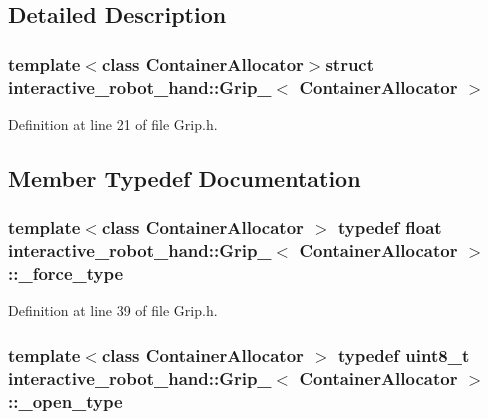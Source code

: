 \subsection{Detailed Description}
\subsubsection*{template$<$class Container\-Allocator$>$struct interactive\-\_\-robot\-\_\-hand\-::\-Grip\-\_\-$<$ Container\-Allocator $>$}



Definition at line 21 of file Grip.\-h.



\subsection{Member Typedef Documentation}
\subsubsection[{\-\_\-force\-\_\-type}]{\setlength{\rightskip}{0pt plus 5cm}template$<$class Container\-Allocator $>$ typedef float {\bf interactive\-\_\-robot\-\_\-hand\-::\-Grip\-\_\-}$<$ Container\-Allocator $>$\-::{\bf \-\_\-force\-\_\-type}}\label{structinteractive__robot__hand_1_1Grip___ae886c514956e933e7ea7f1cf9e95d9f7}


Definition at line 39 of file Grip.\-h.

\subsubsection[{\-\_\-open\-\_\-type}]{\setlength{\rightskip}{0pt plus 5cm}template$<$class Container\-Allocator $>$ typedef uint8\-\_\-t {\bf interactive\-\_\-robot\-\_\-hand\-::\-Grip\-\_\-}$<$ Container\-Allocator $>$\-::{\bf \-\_\-open\-\_\-type}}\label{structinteractive__robot__hand_1_1Grip___a1e61bb18dddd98f68ac2a949428612a5}


